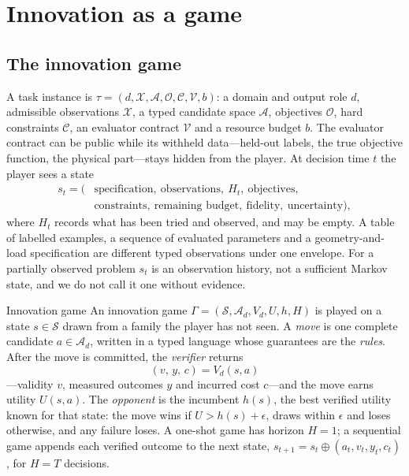 \section{Innovation as a game}
\label{sec:formulation}

\subsection{The innovation game}

A task instance is $\tau=(d,\mathcal X,\mathcal A,\mathcal O,\mathcal C,\mathcal V,b)$: a domain and
output role $d$, admissible observations $\mathcal X$, a typed candidate space $\mathcal A$,
objectives $\mathcal O$, hard constraints $\mathcal C$, an evaluator contract $\mathcal V$ and a
resource budget $b$. The evaluator contract can be public while its withheld data---held-out labels,
the true objective function, the physical part---stays hidden from the player. At decision time $t$
the player sees a state
\begin{equation}
\begin{aligned}
s_t=\bigl(&\text{specification},\ \text{observations},\ H_t,\ \text{objectives},\\
&\text{constraints},\ \text{remaining budget},\ \text{fidelity},\ \text{uncertainty}\bigr),
\end{aligned}
\label{eq:state}
\end{equation}
where $H_t$ records what has been tried and observed, and may be empty. A table of labelled
examples, a sequence of evaluated parameters and a geometry-and-load specification are different
typed observations under one envelope. For a partially observed problem $s_t$ is an observation
history, not a sufficient Markov state, and we do not call it one without evidence.

\begin{definition}{Innovation game}
\label{def:game}
An innovation game $\Gamma=(\mathcal S,\mathcal A_d,V_d,U,h,H)$ is played on a state
$s\in\mathcal S$ drawn from a family the player has not seen. A \emph{move} is one complete candidate
$a\in\mathcal A_d$, written in a typed language whose guarantees are the \emph{rules}. After the move
is committed, the \emph{verifier} returns
\begin{equation*}
(v,\,y,\,c)=V_d(s,a)
\end{equation*}
---validity $v$, measured outcomes $y$ and incurred cost $c$---and the move earns utility
$U(s,a)$. The \emph{opponent} is the incumbent $h(s)$, the best verified utility known for that
state: the move wins if $U>h(s)+\epsilon$, draws within $\epsilon$ and loses otherwise, and any
failure loses. A one-shot game has horizon $H=1$; a sequential game appends each verified outcome to
the next state, $s_{t+1}=s_t\oplus(a_t,v_t,y_t,c_t)$, for $H=T$ decisions.
\end{definition}

